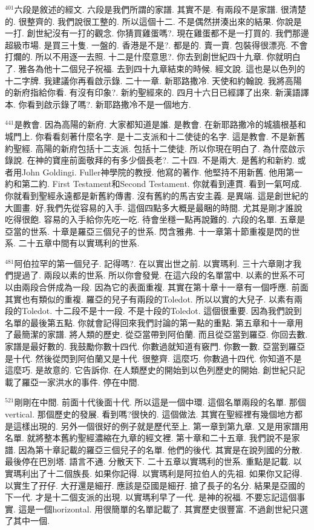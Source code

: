 \documentclass{book}
\begin{document}
$^{401}$六段是敘述的經文.
六段是我們所謂的家譜.
其實不是.
有兩段不是家譜.
很清楚的.
很整齊的.
我們說很工整的.
所以這個十二.
不是偶然拼湊出來的結果.
你說是一打.
創世紀沒有一打的觀念.
你猜買雞蛋嗎?.
現在雞蛋都不是一打買的.
我們那邊超級市場.
是買三十隻.
一盤的.
香港是不是?.
都是的.
賣一賣.
包裝得很漂亮.
不會打爛的.
所以不用逐一去照.
十二是什麼意思?.
你去到創世紀四十九章.
你就明白了.
雅各為他十二個兒子祝福.
去到四十九章結束的時候.
經文說.
這也是以色列的十二字牌.
我建議你再看啟示錄.
二十一章.
新耶路撒冷.
天使和約翰說.
我將高陽的新府指給你看.
有沒有印象?.
新約聖經來的.
四月十六日已經譯了出來.
新漢語譯本.
你看到啟示錄了嗎?.
新耶路撒冷不是一個地方.

$^{441}$是教會.
因為高陽的新府.
大家都知道是誰.
是教會.
在新耶路撒冷的城牆根基和城門上.
你看看刻著什麼名字.
是十二支派和十二使徒的名字.
這是教會.
不是新舊約聖經.
高陽的新府包括十二支派.
包括十二使徒.
所以你現在明白了.
為什麼啟示錄說.
在神的寶座前面敬拜的有多少個長老?.
二十四.
不是兩大.
是舊約和新約.
或者用John Goldingi.
Fuller神學院的教授.
他寫的著作.
他堅持不用新舊.
他用第一約和第二約.
First Testament和Second Testament.
你就看到連貫.
看到一氣呵成.
你就看到聖經永遠都是新舊約傳書.
沒有舊約的馬吉安主義.
是異端.
這是創世紀的大圖畫.
好,我們先從容易的入手.
這個四點多大概是最睏的時間.
尤其是剛才誰說吃得很飽.
容易的入手給你先吃一吃.
待會坐穩一點再說難的.
六段的名單.
五章是亞當的世系.
十章是羅亞三個兒子的世系.
閃含雅弗.
十一章第十節重複是閃的世系.
二十五章中間有以實瑪利的世系.

$^{481}$阿伯拉罕的第一個兒子.
記得嗎?.
在以實出世之前.
以實瑪利.
三十六章剛才我們提過了.
兩段以素的世系.
所以你會發覺.
在這六段的名單當中.
以素的世系不可以由兩段合併成為一段.
因為它的表面重複.
其實在第十章十一章有一個呼應.
前面其實也有類似的重複.
羅亞的兒子有兩段的Toledot.
所以以實的大兒子.
以素有兩段的Toledot.
十二段不是十一段.
不是十段的Toledot.
這個很重要.
因為我們說到名單的最後第五點.
你就會記得回來我們討論的第一點的重點.
第五章和十一章用了最簡潔的家譜.
將人類的歷史.
從亞當帶到阿伯蘭.
而且從亞當到羅亞.
你回去數.
家譜是最好數的.
我鼓勵你數十四代.
你數過就知道有竅門.
你數一數.
亞當到羅亞是十代.
然後從閃到阿伯蘭又是十代.
很整齊.
這麼巧.
你數過十四代.
你知道不是這麼巧.
是故意的.
它告訴你.
在人類歷史的開始到以色列歷史的開始.
創世紀只記載了羅亞一家洪水的事件.
停在中間.

$^{521}$剛剛在中間.
前面十代後面十代.
所以這是一個中環.
這個名單兩段的名單.
那個vertical.
那個歷史的發展.
看到嗎?很快的.
這個做法.
其實在聖經裡有幾個地方都是這樣出現的.
另外一個很好的例子就是歷代至上.
第一章到第九章.
又是用家譜用名單.
就將整本舊約聖經濃縮在九章的經文裡.
第十章和二十五章.
我們說不是家譜.
因為第十章記載的羅亞三個兒子的名單.
他們的後代.
其實是在說列國的分散.
最後停在巴別塔.
語言不通.
分散天下.
二十五章以實瑪利的世系.
重點是記載.
以實瑪利出了十二個族長.
如果你記得.
以實瑪利是阿拉伯人的先祖.
如果你又記得.
以實生了孖仔.
大孖還是細孖.
應該是亞國是細孖.
搶了長子的名分.
結果是亞國的下一代.
才是十二個支派的出現.
以實瑪利早了一代.
是神的祝福.
不要忘記這個事實.
這是一個horizontal.
用很簡單的名單記載了.
其實歷史很豐富.
不過創世紀只選了其中一個.
\end{document}
